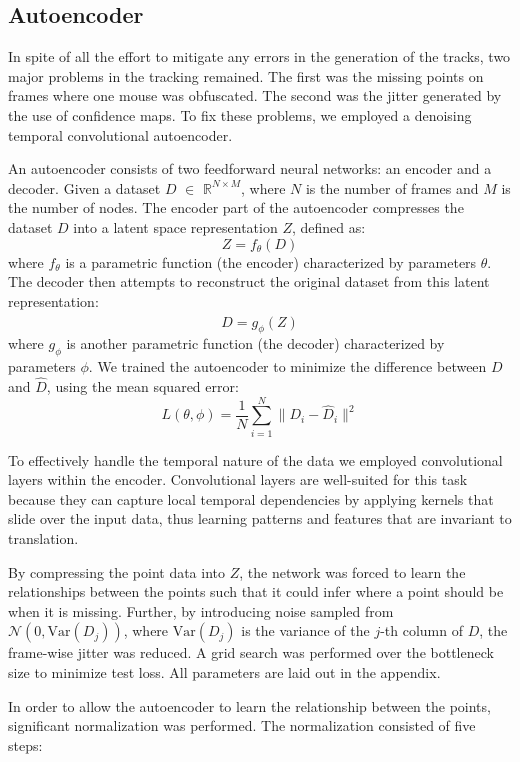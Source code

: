 \documentclass[12pt,english]{article}
\begin{document}

\subsection{Autoencoder}

In spite of all the effort to mitigate any errors in the generation of the tracks, two major problems in the tracking remained. The first was the missing points on frames where one mouse was obfuscated. The second was the jitter generated by the use of confidence maps. To fix these problems, we employed a denoising temporal convolutional autoencoder.

An autoencoder consists of two feedforward neural networks: an encoder and a decoder. Given a dataset \( D \) $\in$ \( \mathbb{R}^{N \times M} \), where \( N \) is the number of frames and \( M \) is the number of nodes. The encoder part of the autoencoder compresses the dataset \( D \) into a latent space representation \( Z \), defined as:
\[ Z = f_\theta(D) \]
where \( f_\theta \) is a parametric function (the encoder) characterized by parameters \( \theta \). The decoder then attempts to reconstruct the original dataset from this latent representation:
\[ \hat{D} = g_\phi(Z) \]
where \( g_\phi \) is another parametric function (the decoder) characterized by parameters \( \phi \). We trained the autoencoder to minimize the difference between \( D \) and \( \hat{D} \), using the mean squared error:
\[ L(\theta, \phi) = \frac{1}{N} \sum_{i=1}^{N} \|D_i - \hat{D}_i\|^2 \]

To effectively handle the temporal nature of the data we employed convolutional layers within the encoder. Convolutional layers are well-suited for this task because they can capture local temporal dependencies by applying kernels that slide over the input data, thus learning patterns and features that are invariant to translation.

By compressing the point data into \( Z \), the network was forced to learn the relationships between the points such that it could infer where a point should be when it is missing. Further, by introducing noise sampled from \( \mathcal{N}(0, \text{Var}(D_j)) \), where \( \text{Var}(D_j) \) is the variance of the \( j \)-th column of \( D \), the frame-wise jitter was reduced. A grid search was performed over the bottleneck size to minimize test loss. All parameters are laid out in the appendix.

In order to allow the autoencoder to learn the relationship between the points, significant normalization was performed. The normalization consisted of five steps:
\end{document}
